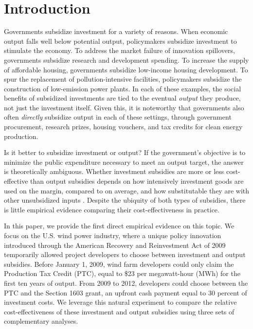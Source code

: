 \documentclass[12pt]{article}
\begin{document}
\pagebreak
\section{Introduction}

Governments subsidize investment for a variety of reasons. When economic output falls well below potential output, policymakers subsidize investment to stimulate the economy. To address the market failure of innovation spillovers, governments subsidize research and development spending. To increase the supply of affordable housing, governments subsidize low-income housing development. To spur the replacement of pollution-intensive facilities, policymakers subsidize the construction of low-emission power plants. In each of these examples, the social benefits of subsidized investments are tied to the eventual \textit{output} they produce, not just the investment itself. Given this, it is noteworthy that governments also often \textit{directly} subsidize output in each of these settings, through government procurement, research prizes, housing vouchers, and tax credits for clean energy production. 

Is it better to subsidize investment or output? If the government's objective is to minimize the public expenditure necessary to meet an output target, the answer is theoretically ambiguous. Whether investment subsidies are more or less cost-effective than output subsidies depends on how intensively investment goods are used on the margin, compared to on average, and how substitutable they are with other unsubsidized inputs \citep{parish_relative_1982}. Despite the ubiquity of both types of subsidies, there is little empirical evidence comparing their cost-effectiveness in practice. 

In this paper, we provide the first direct empirical evidence on this topic. We focus on the U.S. wind power industry, where a unique policy innovation introduced through the American Recovery and Reinvestment Act of 2009 temporarily allowed project developers to choose between investment and output subsidies. Before January 1, 2009, wind farm developers could only claim the Production Tax Credit (PTC), equal to \$23 per megawatt-hour (MWh) for the first ten years of output. From 2009 to 2012, developers could choose between the PTC and the Section 1603 grant, an upfront cash payment equal to 30 percent of investment costs. We leverage this natural experiment to compare the relative cost-effectiveness of these investment and output subsidies using three sets of complementary analyses. 
\end{document}
